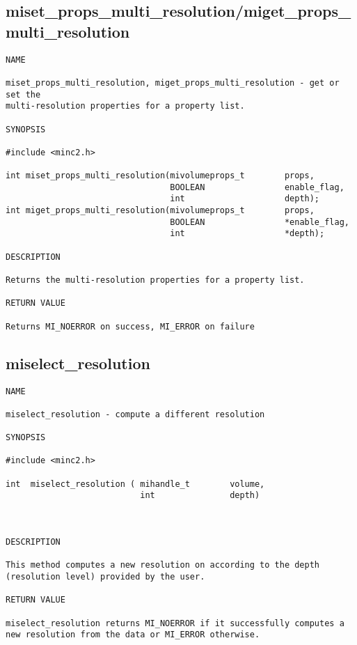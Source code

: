 \documentclass{article}
\begin{document}
\subsection{miset\_props\_multi\_resolution/miget\_props\_multi\_resolution}
\begin{verbatim}
NAME

miset_props_multi_resolution, miget_props_multi_resolution - get or set the
multi-resolution properties for a property list.

SYNOPSIS

#include <minc2.h>

int miset_props_multi_resolution(mivolumeprops_t        props, 
                                 BOOLEAN                enable_flag,
                                 int                    depth);
int miget_props_multi_resolution(mivolumeprops_t        props, 
                                 BOOLEAN                *enable_flag,
                                 int                    *depth);

DESCRIPTION

Returns the multi-resolution properties for a property list.

RETURN VALUE

Returns MI_NOERROR on success, MI_ERROR on failure
\end{verbatim}

\subsection{miselect\_resolution}
\begin{verbatim}
NAME 

miselect_resolution - compute a different resolution

SYNOPSIS

#include <minc2.h>

int  miselect_resolution ( mihandle_t        volume,
                           int               depth)
                                   
                       
                                
DESCRIPTION

This method computes a new resolution on according to the depth 
(resolution level) provided by the user. 

RETURN VALUE

miselect_resolution returns MI_NOERROR if it successfully computes a
new resolution from the data or MI_ERROR otherwise.
\end{verbatim}
\end{document}
